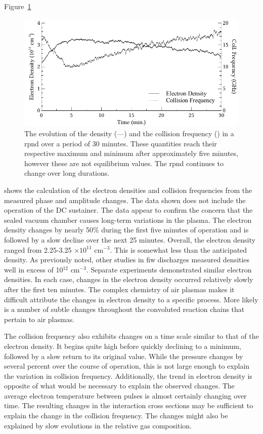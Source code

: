 Figure~\ref{fig:densev}
\begin{figure}
  \centering
  \includegraphics{./chapters/nasa/figures/densev.pdf}
  \caption{The evolution of the density (---) and the collision frequency
    (\raisebox{2.5pt}{${\scriptscriptstyle \centerdot \centerdot \centerdot}$}) in
    a \acs{rpnd} over a period of 30 minutes. These quantities reach their
    respective maximum and minimum after approximately five minutes, however these
    are not equilibrium values. The \acs{rpnd} continues to change over long
    durations.}
  \label{fig:densev}
\end{figure}
shows the calculation of the electron densities and collision frequencies from
the measured phase and amplitude changes. The data shown does not include the
operation of the DC sustainer. The data appear to confirm the concern that the
sealed vacuum chamber causes long-term variations in the plasma. The electron
density changes by nearly 50\% during the first five minutes of operation and is
followed by a slow decline over the next 25 minutes. Overall, the electron
density ranged from 2.25-3.25 $\times10^{11}$ cm$^{-3}$. This is somewhat less
than the anticipated density. As previously noted, other studies in \acs{fiw}
discharges \cite{Aleksandrov2007, Pancheshnyi1999, Macheret2006} measured
densities well in excess of 10$^{12}$ cm$^{-3}$. Separate experiments
demonstrated similar electron densities. In each case, changes in the electron
density occurred relatively slowly after the first ten minutes. The complex
chemistry of air plasmas makes it difficult attribute the changes in electron
density to a specific process. More likely is a number of subtle changes
throughout the convoluted reaction chains that pertain to air plasmas.

The collision frequency also exhibits changes on a time scale similar to that of
the electron density. It begins quite high before quickly declining to a
minimum, followed by a slow return to its original value. While the pressure
changes by several percent over the course of operation, this is not large
enough to explain the variation in collision frequency. Additionally, the trend
in electron density is opposite of what would be necessary to explain the
observed changes. The average electron temperature between pulses is almost
certainly changing over time. The resulting changes in the interaction cross
sections may be sufficient to explain the change in the collision frequency.
The changes might also be explained by slow evolutions in the relative gas
composition.

